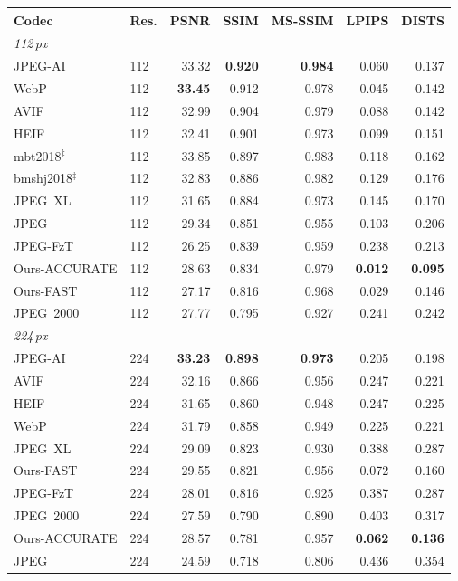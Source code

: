 \begin{tabular}{llrrrrr}
\toprule
Codec & Res. & PSNR & SSIM & MS-SSIM & LPIPS & DISTS \\
\midrule
\multicolumn{7}{l}{\textit{112\,px}} \\
JPEG-AI & 112 & 33.32 & \cellcolor{green!25}\textbf{0.920} & \cellcolor{green!25}\textbf{0.984} & 0.060 & 0.137 \\
WebP & 112 & \cellcolor{green!25}\textbf{33.45} & 0.912 & 0.978 & 0.045 & 0.142 \\
AVIF & 112 & 32.99 & 0.904 & 0.979 & 0.088 & 0.142 \\
HEIF & 112 & 32.41 & 0.901 & 0.973 & 0.099 & 0.151 \\
mbt2018$^{\ddagger}$ & 112 & 33.85 & 0.897 & 0.983 & 0.118 & 0.162 \\
bmshj2018$^{\ddagger}$ & 112 & 32.83 & 0.886 & 0.982 & 0.129 & 0.176 \\
JPEG~XL & 112 & 31.65 & 0.884 & 0.973 & 0.145 & 0.170 \\
JPEG & 112 & 29.34 & 0.851 & 0.955 & 0.103 & 0.206 \\
JPEG-FzT & 112 & \cellcolor{red!22}\underline{26.25} & 0.839 & 0.959 & 0.238 & 0.213 \\
Ours-ACCURATE & 112 & 28.63 & 0.834 & 0.979 & \cellcolor{green!25}\textbf{0.012} & \cellcolor{green!25}\textbf{0.095} \\
Ours-FAST & 112 & 27.17 & 0.816 & 0.968 & 0.029 & 0.146 \\
JPEG~2000 & 112 & 27.77 & \cellcolor{red!22}\underline{0.795} & \cellcolor{red!22}\underline{0.927} & \cellcolor{red!22}\underline{0.241} & \cellcolor{red!22}\underline{0.242} \\
\midrule
\multicolumn{7}{l}{\textit{224\,px}} \\
JPEG-AI & 224 & \cellcolor{green!25}\textbf{33.23} & \cellcolor{green!25}\textbf{0.898} & \cellcolor{green!25}\textbf{0.973} & 0.205 & 0.198 \\
AVIF & 224 & 32.16 & 0.866 & 0.956 & 0.247 & 0.221 \\
HEIF & 224 & 31.65 & 0.860 & 0.948 & 0.247 & 0.225 \\
WebP & 224 & 31.79 & 0.858 & 0.949 & 0.225 & 0.221 \\
JPEG~XL & 224 & 29.09 & 0.823 & 0.930 & 0.388 & 0.287 \\
Ours-FAST & 224 & 29.55 & 0.821 & 0.956 & 0.072 & 0.160 \\
JPEG-FzT & 224 & 28.01 & 0.816 & 0.925 & 0.387 & 0.287 \\
JPEG~2000 & 224 & 27.59 & 0.790 & 0.890 & 0.403 & 0.317 \\
Ours-ACCURATE & 224 & 28.57 & 0.781 & 0.957 & \cellcolor{green!25}\textbf{0.062} & \cellcolor{green!25}\textbf{0.136} \\
JPEG & 224 & \cellcolor{red!22}\underline{24.59} & \cellcolor{red!22}\underline{0.718} & \cellcolor{red!22}\underline{0.806} & \cellcolor{red!22}\underline{0.436} & \cellcolor{red!22}\underline{0.354} \\
\bottomrule
\end{tabular}
